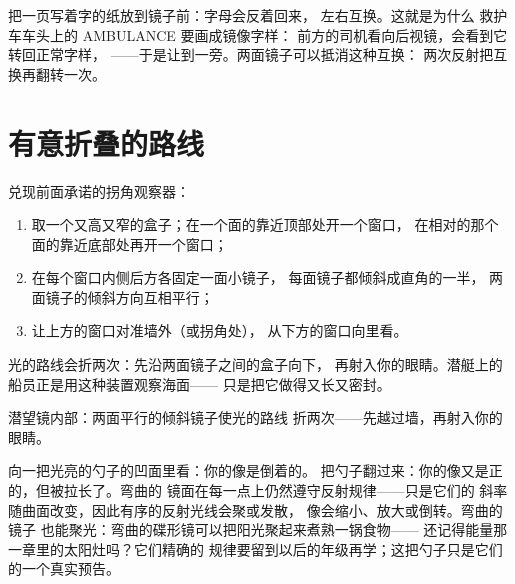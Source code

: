 \begin{example}[交换的世界]\label{ex:g5:mirrors-reflection:swap}
把一页写着字的纸放到镜子前：字母会反着回来，
左右互换。这就是为什么
救护车车头上的 AMBULANCE 要画成镜像字样：
前方的司机看向后视镜，会看到它转回正常字样，
——于是让到一旁。两面镜子可以抵消这种互换：
两次反射把互换再翻转一次。
\end{example}

\section{有意折叠的路线}

\begin{method}[制作潜望镜]\label{met:g5:mirrors-reflection:periscope}
兑现前面承诺的拐角观察器：
\begin{enumerate}
  \item 取一个又高又窄的盒子；在一个面的靠近顶部处开一个窗口，
        在相对的那个面的靠近底部处再开一个窗口；
  \item 在每个窗口内侧后方各固定一面小镜子，
        每面镜子都倾斜成直角的一半，
        两面镜子的倾斜方向互相平行；
  \item 让上方的窗口对准墙外（或拐角处），
        从下方的窗口向里看。
\end{enumerate}
光的路线会折两次：先沿两面镜子之间的盒子向下，
再射入你的眼睛。潜艇上的船员正是用这种装置观察海面——
只是把它做得又长又密封。
\end{method}

\begin{omfigure}

{\small 潜望镜内部：两面平行的倾斜镜子使光的路线
折两次——先越过墙，再射入你的眼睛。}
\end{omfigure}

\begin{remark}[哈哈镜里的勺子]\label{rem:g5:mirrors-reflection:curved}
向一把光亮的勺子的凹面里看：你的像是倒着的。
把勺子翻过来：你的像又是正的，但被拉长了。弯曲的
镜面在每一点上仍然遵守反射规律——只是它们的
斜率随曲面改变，因此有序的反射光线会聚或发散，
像会缩小、放大或倒转。弯曲的镜子
也能聚光：弯曲的碟形镜可以把阳光聚起来煮熟一锅食物——
还记得能量那一章里的太阳灶吗？它们精确的
规律要留到以后的年级再学；这把勺子只是它们的一个真实预告。
\end{remark}

